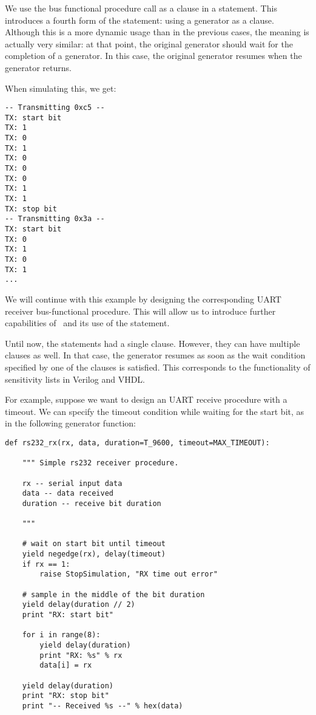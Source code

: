 We use the bus functional procedure call as a clause in a
 statement. This introduces a fourth form of the
 statement: using a generator as a clause. Although this is
a more dynamic usage than in the previous cases, the meaning is
actually very similar: at that point,
the original generator should 
wait for the completion of a generator. 
In this case, the original generator resumes when the
 generator returns.

When simulating this, we get:

\begin{verbatim}
-- Transmitting 0xc5 --
TX: start bit
TX: 1
TX: 0
TX: 1
TX: 0
TX: 0
TX: 0
TX: 1
TX: 1
TX: stop bit
-- Transmitting 0x3a --
TX: start bit
TX: 0
TX: 1
TX: 0
TX: 1
...
\end{verbatim}

We will continue with this example by designing the corresponding UART
receiver bus-functional procedure. This will allow us to introduce
further capabilities of \myhdl\ and its use of the 
statement. 

Until now, the  statements had a single clause. However,
they can have multiple clauses as well. In that case, the generator
resumes as soon as the wait condition specified by one
of the clauses is satisfied. This corresponds to the functionality of
sensitivity lists in Verilog and VHDL.

For example, suppose we want to design an UART receive procedure with
a timeout. We can specify the timeout condition while waiting for the
start bit, as in the following generator function:

\begin{verbatim}
def rs232_rx(rx, data, duration=T_9600, timeout=MAX_TIMEOUT):
    
    """ Simple rs232 receiver procedure.

    rx -- serial input data
    data -- data received
    duration -- receive bit duration
    
    """

    # wait on start bit until timeout
    yield negedge(rx), delay(timeout)
    if rx == 1:
        raise StopSimulation, "RX time out error"

    # sample in the middle of the bit duration
    yield delay(duration // 2)
    print "RX: start bit"

    for i in range(8):
        yield delay(duration)
        print "RX: %s" % rx
        data[i] = rx

    yield delay(duration)
    print "RX: stop bit"
    print "-- Received %s --" % hex(data)
\end{verbatim}

